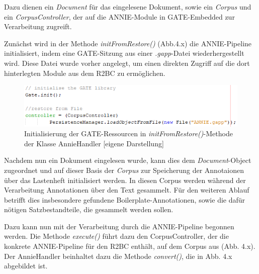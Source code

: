 \documentclass[12pt]{report}
\begin{document}
Dazu dienen ein \textit{Document} für das eingelesene Dokument, sowie ein \textit{Corpus} und ein \textit{CorpusController}, der auf die ANNIE-Module in GATE-Embedded zur Verarbeitung zugreift.

Zunächst wird in der Methode \textit{initFromRestore()} (Abb.4.x) die ANNIE-Pipeline initialisiert, indem eine GATE-Sitzung aus einer \textit{.gapp}-Datei wiederhergestellt wird. Diese Datei wurde vorher angelegt, um einen direkten Zugriff auf die dort hinterlegten Module aus dem R2BC zu ermöglichen.

\begin{figure}[h!]
\begin{center}
\includegraphics[scale=1]{Bilder/AnnieHandler-initFromRestore.png}
\caption{Initialisierung der GATE-Ressourcen in \textit{initFromRestore()}-Methode der Klasse AnnieHandler [eigene Darstellung]}
\end{center}
\end{figure}

Nachdem nun ein Dokument eingelesen wurde, kann dies dem \textit{Document}-Object zugeordnet und auf dieser Basis der \textit{Corpus} zur Speicherung der Annotaionen über das Lastenheft initialisiert werden. In diesen Corpus werden während der Verarbeitung Annotationen über den Text gesammelt. Für den weiteren Ablauf betrifft dies insbesondere gefundene Boilerplate-Annotationen, sowie die dafür nötigen Satzbestandteile, die gesammelt werden sollen. 

Dazu kann nun mit der Verarbeitung durch die ANNIE-Pipeline begonnen werden. Die Methode \textit{execute()} führt dazu den CorpusController, der die konkrete ANNIE-Pipeline für den R2BC enthält, auf dem Corpus aus (Abb. 4.x). Der AnnieHandler beinhaltet dazu die Methode \textit{convert()}, die in Abb. 4.x abgebildet ist.
\end{document}
